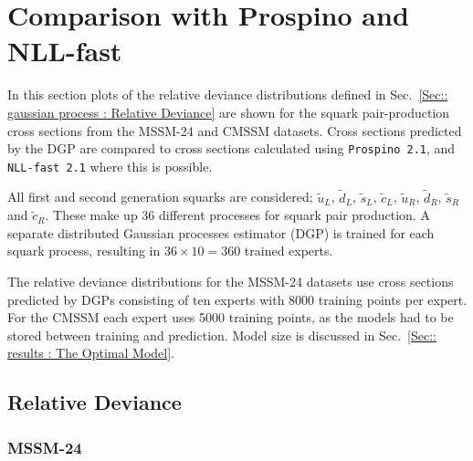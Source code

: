 \documentclass[twoside,english]{uiofysmaster}
\begin{document}
{{\section{Comparison with Prospino and NLL-fast}

In this section plots of the relative deviance distributions defined in Sec.~\ref{Sec:: gaussian process : Relative Deviance} are shown for the squark pair-production cross sections from the MSSM-24 and CMSSM datasets. Cross sections predicted by the DGP are compared to cross sections calculated using \verb|Prospino 2.1|, and \verb|NLL-fast 2.1| where this is possible. 

All first and second generation squarks are considered; $\widetilde{u}_L$, $\widetilde{d}_L$, $\widetilde{s}_L$, $\widetilde{c}_L$, $\widetilde{u}_R$, $\widetilde{d}_R$, $\widetilde{s}_R$ and $\widetilde{c}_R$. These make up 36 different processes for squark pair production. A separate distributed Gaussian processes estimator (DGP) is trained for each squark process, resulting in $36 \times 10 = 360$ trained experts. 

The relative deviance distributions for the MSSM-24 datasets use cross sections predicted by DGPs consisting of ten experts with 8000 training points per expert. For the CMSSM each expert uses 5000 training points, as the models had to be stored between training and prediction. Model size is discussed in Sec.~\ref{Sec:: results : The Optimal Model}.

\subsection{Relative Deviance}\label{Sec:: results : Relative Deviance}


\subsubsection{MSSM-24}

}}
\end{document}
